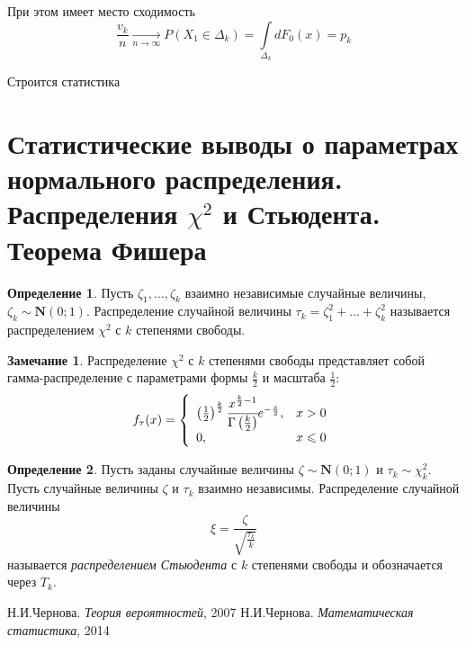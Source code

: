 \documentclass[oneside,final,14pt]{extreport}
\theoremstyle{plain}
\theoremstyle{definition}
\newtheorem*{defn}{Определение}
\newtheorem*{rmrk}{Замечание}
\theoremstyle{named}
\begin{document}
При этом имеет место сходимость
\begin{equation*}
    \frac{v_k}{n} \xrightarrow[n \to \infty]{} P\left(X_{1} \in \Delta_{k}\right)=\int\limits_{\Delta_{k}} d F_{0}(x)=p_{k}
\end{equation*}

Строится статистика

\section{Статистические выводы о параметрах нормального распределения. Распределения $\chi^{2}$ и Стьюдента. Теорема Фишера}

\begin{defn}
    Пусть $\zeta_{1}, \ldots, \zeta_{k}$ взаимно независимые случайные величины, $\zeta_{k} \sim \mathbf{N}(0;1)$. Распределение случайной величины $\tau_{k}=\zeta_{1}^{2}+\ldots+\zeta_{k}^{2}$ называется распределением $\chi^{2}$ с $k$ степенями свободы.
\end{defn}
\begin{rmrk}
    Распределение $\chi^{2}$ с $k$ степенями свободы представляет собой гамма-распределение с параметрами формы $\frac{k}{2}$ и масштаба $\frac{1}{2}$:
    \begin{equation*}
    f_{\tau}(x)=\left\{\begin{array}{ll}
        \left(\frac{1}{2}\right)^{\frac{k}{2}} \cfrac{x^{\frac{k}{2}-1}}{\Gamma\left(\frac{k}{2}\right)} e^{-\frac{x}{2}}, & x>0 \\
        0, & x \leqslant 0
    \end{array}\right.
    \end{equation*}
\end{rmrk}

\begin{defn}
    Пусть заданы случайные величины $\zeta \sim \mathbf{N}(0;1)$ и $\tau_{k} \sim \chi_{k}^{2}$. Пусть случайные величины $\zeta$ и $\tau_{k}$ взаимно независимы. Распределение случайной величины 
    \begin{equation*}
        \xi=\frac{\zeta}{\sqrt{\frac{\tau_{k}}{k}}}
    \end{equation*}
    называется {\it распределением Стьюдента} с $k$ степенями свободы и обозначается через $T_{k}$.
\end{defn}

\begin{thebibliography}{1}
		Н.И.Чернова.
		{\it Теория вероятностей},
		2007
		Н.И.Чернова.
		{\it Математическая статистика},
		2014
\end{thebibliography}
\end{document}
